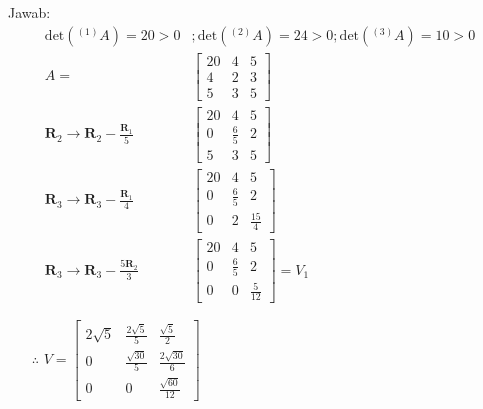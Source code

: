\documentclass[12pt, a4paper]{scrartcl}
\begin{document}
\begin{enumerate}
\begin{enumerate}
                Jawab:
                \begin{align*}
                    \mbox{det}(^{(1)}A)=20>0&;\mbox{det}(^{(2)}A)=24>0;\mbox{det}(^{(3)}A)=10>0
                    \\ A = &\begin{bmatrix}
                        20 & 4 & 5\\
                        4 & 2 & 3\\
                        5 & 3 & 5
                    \end{bmatrix}
                    \\ \textbf{R}_2 \to \textbf{R}_2 - \frac{\textbf{R}_1}{5} &\begin{bmatrix}
                        20 & 4 & 5\\
                        0 & \frac{6}{5} & 2\\
                        5 & 3 & 5
                    \end{bmatrix}
                    \\ \textbf{R}_3 \to \textbf{R}_3 - \frac{\textbf{R}_1}{4} &\begin{bmatrix}
                        20 & 4 & 5\\
                        0 & \frac{6}{5} & 2\\
                        0 & 2 & \frac{15}{4}
                    \end{bmatrix}
                    \\ \textbf{R}_3 \to \textbf{R}_3 - \frac{5\textbf{R}_2}{3} &\begin{bmatrix}
                        20 & 4 & 5\\
                        0 & \frac{6}{5} & 2\\
                        0 & 0 & \frac{5}{12}
                    \end{bmatrix} = V_1
                \end{align*}
                \begin{itemize}
                    \item[$\therefore$] $V = \begin{bmatrix}
                        2\sqrt{5} & \frac{2\sqrt{5}}{5} & \frac{\sqrt{5}}{2}
                        \\ 0 & \frac{\sqrt{30}}{5} & \frac{2\sqrt{30}}{6}
                        \\ 0 & 0 & \frac{\sqrt{60}}{12}
                    \end{bmatrix}$
                \end{itemize}

            \end{enumerate}
        \end{enumerate}
\end{document}
